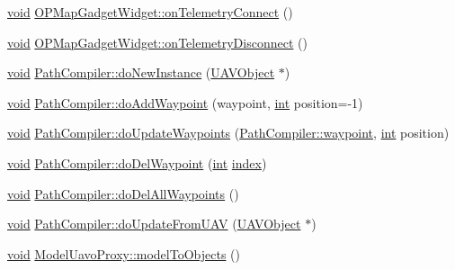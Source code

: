 \begin{DoxyCompactItemize}
\item 
\hyperlink{group___u_a_v_objects_plugin_ga444cf2ff3f0ecbe028adce838d373f5c}{void} \hyperlink{group___o_p_map_plugin_gad7068b438d89bb8f2a9e31ef5ca2d708}{O\-P\-Map\-Gadget\-Widget\-::on\-Telemetry\-Connect} ()
\item 
\hyperlink{group___u_a_v_objects_plugin_ga444cf2ff3f0ecbe028adce838d373f5c}{void} \hyperlink{group___o_p_map_plugin_ga723918dc2ebb03ce17180228e4233d06}{O\-P\-Map\-Gadget\-Widget\-::on\-Telemetry\-Disconnect} ()
\item 
\hyperlink{group___u_a_v_objects_plugin_ga444cf2ff3f0ecbe028adce838d373f5c}{void} \hyperlink{group___o_p_map_plugin_ga1089b3cd3bacf871b8db6f14a1305819}{Path\-Compiler\-::do\-New\-Instance} (\hyperlink{class_u_a_v_object}{U\-A\-V\-Object} $\ast$)
\item 
\hyperlink{group___u_a_v_objects_plugin_ga444cf2ff3f0ecbe028adce838d373f5c}{void} \hyperlink{group___o_p_map_plugin_gac62083613851ca96a2d14632d9553171}{Path\-Compiler\-::do\-Add\-Waypoint} (waypoint, \hyperlink{ioapi_8h_a787fa3cf048117ba7123753c1e74fcd6}{int} position=-\/1)
\item 
\hyperlink{group___u_a_v_objects_plugin_ga444cf2ff3f0ecbe028adce838d373f5c}{void} \hyperlink{group___o_p_map_plugin_gaadeb33c165349ef42df9dffe0d9d7b57}{Path\-Compiler\-::do\-Update\-Waypoints} (\hyperlink{class_path_compiler_1_1waypoint}{Path\-Compiler\-::waypoint}, \hyperlink{ioapi_8h_a787fa3cf048117ba7123753c1e74fcd6}{int} position)
\item 
\hyperlink{group___u_a_v_objects_plugin_ga444cf2ff3f0ecbe028adce838d373f5c}{void} \hyperlink{group___o_p_map_plugin_ga2e7d1eed3bd9981e4f1c7d4bfeeeeba4}{Path\-Compiler\-::do\-Del\-Waypoint} (\hyperlink{ioapi_8h_a787fa3cf048117ba7123753c1e74fcd6}{int} \hyperlink{glext_8h_ab47dd9958bcadea08866b42bf358e95e}{index})
\item 
\hyperlink{group___u_a_v_objects_plugin_ga444cf2ff3f0ecbe028adce838d373f5c}{void} \hyperlink{group___o_p_map_plugin_ga43eeb28430ee8c4569a8163c34198403}{Path\-Compiler\-::do\-Del\-All\-Waypoints} ()
\item 
\hyperlink{group___u_a_v_objects_plugin_ga444cf2ff3f0ecbe028adce838d373f5c}{void} \hyperlink{group___o_p_map_plugin_ga559ab15dae5623715205528a06b9addc}{Path\-Compiler\-::do\-Update\-From\-U\-A\-V} (\hyperlink{class_u_a_v_object}{U\-A\-V\-Object} $\ast$)
\item 
\hyperlink{group___u_a_v_objects_plugin_ga444cf2ff3f0ecbe028adce838d373f5c}{void} \hyperlink{group___o_p_map_plugin_ga3fdf6b22d36aa34b0eb480ab41cf696e}{Model\-Uavo\-Proxy\-::model\-To\-Objects} ()

\end{DoxyCompactItemize}
